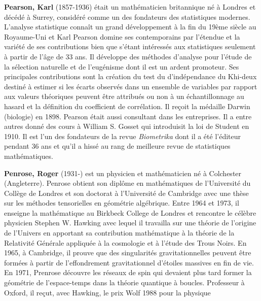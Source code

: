 \textbf{Pearson, Karl} (1857-1936) était un mathématicien britannique né à Londres et décédé à Surrey, considéré comme un des fondateurs des statistiques modernes. L'analyse statistique connaît un grand développement à la fin du 19ème siècle au Royaume-Uni et Karl Pearson domine ses contemporains par l'étendue et la variété de ses contributions bien que s'étant intéressés aux statistiques seulement à partir de l'âge de 33 ans. Il développe des méthodes d'analyse pour l'étude de la sélection naturelle et de l'eugénisme dont il est un ardent promoteur. Ses principales contributions sont la création du test du d'indépendance du Khi-deux destiné à estimer si les écarts observés dans un ensemble de variables par rapport aux valeurs théoriques peuvent être attribués ou non à un échantillonnage au hasard et la définition du coefficient de corrélation. Il reçoit la médaille Darwin (biologie) en 1898. Pearson était aussi consultant dans les entreprises. Il a entre autres donné des cours à William S. Gosset qui introduisit la loi de Student en 1910. Il est l'un des fondateurs de la revue \textit{Biometrika} dont il a été l'éditeur pendant 36 ans et qu'il a hissé au rang de meilleure revue de statistiques mathématiques.

\textbf{Penrose, Roger} (1931-) est un physicien et mathématicien né à Colchester (Angleterre). Penrose obtient son diplôme en mathématiques de l'Université du Collège de Londres et son doctorat à l'Université de Cambridge avec une thèse sur les méthodes tensorielles en géométrie algébrique. Entre 1964 et 1973, il enseigne la mathématique au Birkbeck College de Londres et rencontre le célèbre physicien Stephen W. Hawking avec lequel il travailla sur une théorie de l'origine de l'Univers en apportant sa contribution mathématique à la théorie de la Relativité Générale appliquée à la cosmologie et à l'étude des Trous Noirs. En 1965, à Cambridge, il prouve que des singularités gravitationnelles peuvent être formées à partir de l'effondrement gravitationnel d'étoiles massives en fin de vie. En 1971, Prenrose découvre les réseaux de spin qui devaient plus tard former la géométrie de l'espace-temps dans la théorie quantique à boucles. Professeur à Oxford, il reçut, avec Hawking, le prix Wolf 1988 pour la physique

